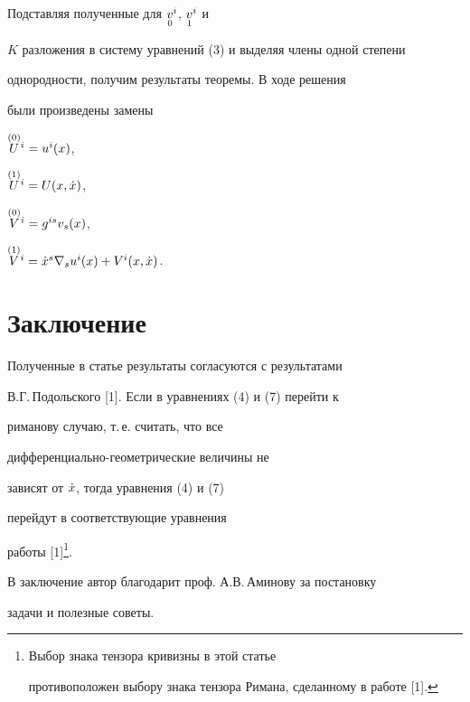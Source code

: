 \begin{pf}
Подставляя полученные для $\sd{v}{0}^{i}$, $\sd{v}{1}^{i}$ и


$K$ разложения в систему уравнений (3) и выделяя члены одной степени


однородности, получим результаты теоремы. В ходе решения 


были произведены замены


$\up{U}{(0)}{}^i = u^{i}(x)$,


$\up{U}{(1)}{}^i = U(x,\xt)$,


$\up{V}{(0)}{}^i = g^{is}v_{s}(x)$,


$\up{V}{(1)}{}^i = 


\xt^{s}\nabla_{s}u^{i}(x) + V^{i}(x,\xt)$.


\end{pf}


\addtocounter{footnote}{-1}





\section*{Заключение}





Полученные в статье результаты согласуются с результатами


В.Г.\,Подольского [1]. Если в уравнениях (4) и (7) перейти к 


риманову случаю, т.\,е. считать, что все 


дифференциально-геометрические величины не 


зависят от $\xt$, тогда уравнения (4) и (7) 


перейдут в соответствующие уравнения 


работы [1]\footnote{Выбор знака тензора кривизны в этой статье 


противоположен выбору знака тензора Римана, сделанному в работе [1].}.





В заключение автор благодарит проф. А.В.\,Аминову за постановку


задачи и полезные советы.








